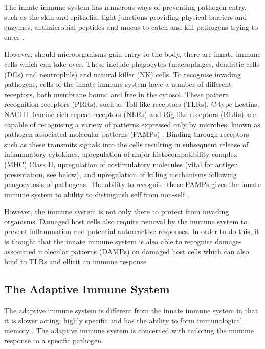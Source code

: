 The innate immune system has numerous ways of preventing pathogen entry, such as the skin and epithelial tight junctions providing physical barriers and enzymes, antimicrobial peptides and mucus to catch and kill pathogens trying to enter \citep{Janeway2001, Parkin2001}.

However, should microorganisms gain entry to the body, there are innate immune cells which can take over.
These include phagocytes (macrophages, dendritic cells (DCs) and neutrophils) and natural killer (NK) cells. 
To recognise invading pathogens, cells of the innate immune system have a number of different receptors, both membrane bound and free in the cytosol.
These pattern recognition receptors (PRRs), such as Toll-like receptors (TLRs), C-type Lectins, NACHT-leucine rich repeat receptors (NLRs) and Rig-like receptors (RLRs) are capable of recognising a variety of patterns expressed only by microbes, known as pathogen-associated molecular patterns (PAMPs) \citep{Medzhitov2000, Iwasaki2004}.
Binding through receptors such as these transmits signals into the cells resulting in subsequent release of inflammatory cytokines, upregulation of major histocompatibility complex (MHC) Class II, upregulation of costimulatory molecules (vital for antigen presentation, see below), and upregulation of killing mechanisms following phagocytosis of pathogens.
The ability to recognise these PAMPs gives the innate immune system to ability to distinguish self from non-self \citep{Medzhitov2000}.

However, the immune system is not only there to protect from invading organisms. 
Damaged host cells also require removal by the immune system  to prevent inflammation and potential autoreactive responses. 
In order to do this, it is thought that the innate immune system is also able to recognise damage-associated molecular patterns (DAMPs) on damaged host cells which can also bind to TLRs and ellicit an immune response \citep{Matzinger1994, Shin2015}

\subsection{The Adaptive Immune System}

The adaptive immune system is different from the innate immune system in that it is slower acting, highly specific and has the ability to form immunological memory \citep{Parkin2001}.
The adaptive immune system is concerned with tailoring the immune response to a specific pathogen.

